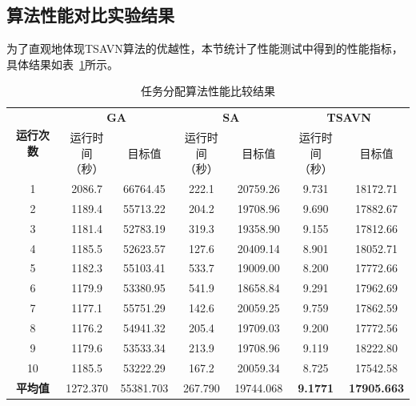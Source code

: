 \subsection{算法性能对比实验结果}

为了直观地体现TSAVN算法的优越性，本节统计了性能测试中得到的性能指标，具体结果如表~\ref{tab:任务分配算法性能比较结果}所示。

\begin{table}[!htbp]
    \caption{任务分配算法性能比较结果}
    \label{tab:任务分配算法性能比较结果}
    \centering
    \begin{tabular}{c c c c c c c}
        \toprule
        \multirow{2}{*}{\textbf{运行次数}} & \multicolumn{2}{c}{\textbf{GA}} & \multicolumn{2}{c}{\textbf{SA}} & \multicolumn{2}{c}{\textbf{TSAVN}} \\
        \cmidrule(lr){2-3} \cmidrule(lr){4-5} \cmidrule(lr){6-7}
        & \makecell{运行时间\\（秒）} & 目标值 & \makecell{运行时间\\（秒）} & 目标值 & \makecell{运行时间\\（秒）} & 目标值 \\
        \midrule
        1 & 2086.7 & 66764.45 & 222.1 & 20759.26 & 9.731 & 18172.71\\
        2 & 1189.4 & 55713.22 & 204.2 & 19708.96 & 9.690 & 17882.67\\
        3 & 1181.4 & 52783.19 & 319.3 & 19358.90 & 9.155 & 17812.66\\
        4 & 1185.5 & 52623.57 & 127.6 & 20409.14 & 8.901 & 18052.71\\
        5 & 1182.3 & 55103.41 & 533.7 & 19009.00 & 8.200 & 17772.66\\
        6 & 1179.9 & 53380.95 & 541.9 & 18658.84 & 9.291 & 17962.69\\
        7 & 1177.1 & 55751.29 & 142.6 & 20059.25 & 9.759 & 17862.59\\
        8 & 1176.2 & 54941.32 & 205.4 & 19709.03 & 9.200 & 17772.56\\
        9 & 1179.6 & 53533.34 & 213.9 & 19708.96 & 9.119 & 18222.80\\
        10 & 1185.5 & 53222.29 & 167.2 & 20059.34 & 8.725 & 17542.58\\
        \textbf{平均值} & 1272.370 & 55381.703 & 267.790 & 19744.068 & \textbf{9.1771} & \textbf{17905.663} \\
        \bottomrule
    \end{tabular}
\end{table}


